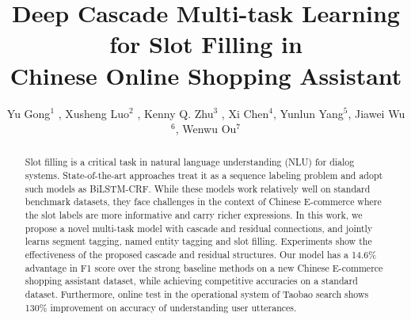 \documentclass[sigconf]{acmart}
\begin{document}
\title{Deep Cascade Multi-task Learning for Slot Filling in \\ Chinese Online Shopping Assistant}




\author{
	Yu Gong$^1$ \footnotemark[1], 
	Xusheng Luo$^2$ \footnotemark[1], 
	Kenny Q. Zhu$^3$ \footnotemark[2],
	Xi Chen$^4$,
	Yunlun Yang$^5$,
	Jiawei Wu$^6$,
	Wenwu Ou$^7$
}



\renewcommand{\shortauthors}{Y. Gong et al.}
\renewcommand{\authors}{Yu Gong, Xusheng Luo, Kenny Q. Zhu, Xi Chen, Yunlun Yang, Jiawei Wu, Wenwu Ou}
\renewcommand{\shorttitle}{DCMTL Slot Filling in Chinese Online Shopping Assistant}

\begin{abstract}
Slot filling is a critical task in natural language understanding
(NLU) for dialog systems.
State-of-the-art approaches treat it as a sequence labeling problem
and adopt such models as BiLSTM-CRF.
While these models work relatively well on standard 
benchmark datasets, they face challenges in the context of
Chinese E-commerce where the slot labels are more informative
and carry richer expressions.
In this work, we propose a novel multi-task model
with cascade and residual connections, and
jointly learns segment tagging, named entity tagging and slot filling.
Experiments show the effectiveness of the proposed
cascade and residual structures. 
Our model has a 14.6\% advantage in F1
score over the strong baseline methods on a new Chinese E-commerce
shopping assistant dataset, while achieving competitive accuracies on
a standard dataset.  
Furthermore, online test in the operational system of Taobao search 
shows 130\% improvement on accuracy of understanding user utterances.
\end{abstract}
\end{document}
